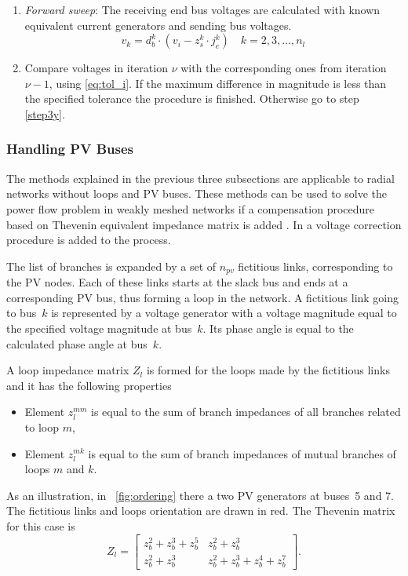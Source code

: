 \documentclass[12pt]{article}
\numberwithin{equation}{section}
\numberwithin{table}{section}
\numberwithin{figure}{section}
\begin{document}
\begin{enumerate}
  \item \textit{Forward sweep}: The receiving end bus voltages are calculated with known equivalent current generators and sending bus voltages.
  \begin{equation}
  \label{eq:for_y}
  v_k = d_b^k \cdot (v_i - z_s^k \cdot j_e^k) \quad k = 2, 3, \ldots ,n_l
  \end{equation}
  
  \item Compare voltages in iteration $\nu$ with the corresponding ones from iteration ${\nu - 1}$, using \eqref{eq:tol_i}. If the maximum difference in magnitude is less than the specified tolerance the procedure is finished. Otherwise go to step \ref{step3y}.
  
\end{enumerate}

\subsubsection{Handling PV Buses}
The methods explained in the previous three subsections are applicable to radial networks without loops and PV buses. These methods can be used to solve the power flow problem in weakly meshed networks if a compensation procedure based on Thevenin equivalent impedance matrix is added \cite{shirmohammadi1988,luo1990}. In \cite{rajicic1994} a voltage correction procedure is added to the process.

The list of branches is expanded by a set
of $n_{pv}$ fictitious links, corresponding to the PV nodes. Each of these links starts at the slack bus and ends at a corresponding PV bus, thus forming a loop in the network. A fictitious link going to bus~$k$ is represented by a voltage generator with a voltage magnitude equal to the specified voltage magnitude at bus~$k$. Its phase angle is equal to the calculated phase angle at bus~$k$.

A loop impedance matrix $Z_l$ is formed for the loops made by the fictitious links and it has the following properties
\begin{itemize}
\item Element $z_l^{mm}$ is equal to the sum of branch impedances of all branches related to loop $m$,
\item Element $z_l^{mk}$ is equal to the sum of branch impedances of mutual branches of loops $m$ and $k$.
\end{itemize}

As an illustration, in \figurename~\ref{fig:ordering} there a two PV generators at buses~5 and 7. The fictitious links and loops orientation are drawn in red. The Thevenin matrix for this case is
\begin{equation*}
Z_l = \left[\begin{array}{cc}
z_b^2 + z_b^3 + z_b^5 & z_b^2 + z_b^3 \\
z_b^2 + z_b^3 & z_b^2 + z_b^3 + z_b^4 + z_b^7
\end{array}
\right].
\end{equation*}
\end{document}

